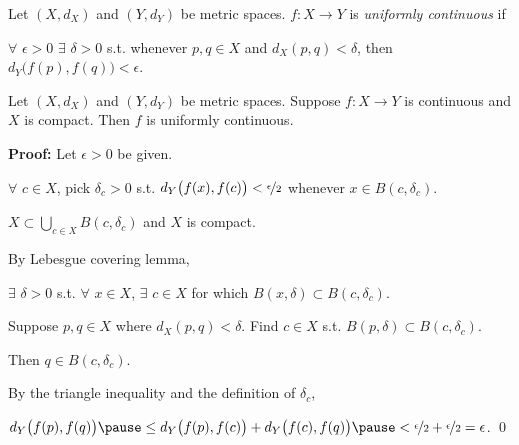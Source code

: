 \documentclass[10pt,aspectratio=169]{beamer}
\begin{document}
\begin{frame}

\begin{definition}
Let $(X,d_X)$ and $(Y,d_Y)$ be metric spaces.
$f \colon X \to Y$ is
\emph{uniformly continuous} if

\pause
$\forall$ $\epsilon > 0$
$\exists$ $\delta > 0$ s.t. whenever $p,q \in X$ and
$d_X(p,q) < \delta$, then
$d_Y\bigl(f(p),f(q)\bigr) < \epsilon$.
\end{definition}

\pause
\begin{theorem}
Let $(X,d_X)$ and $(Y,d_Y)$ be metric spaces.
Suppose $f \colon X \to Y$ is continuous and $X$ is compact.
\pause
Then $f$ is uniformly continuous.
\end{theorem}

\pause
\textbf{Proof:}
Let $\epsilon > 0$ be given.

\pause
$\forall$ $c \in X$,
pick $\delta_c > 0$ s.t.
$d_Y\bigl(f(x),f(c)\bigr) < \nicefrac{\epsilon}{2}$
whenever
$x \in B(c,\delta_c)$.

\pause
$X \subset \bigcup_{c \in X} B(c,\delta_c)$ and $X$ is compact.  

\pause
By Lebesgue covering lemma,

$\exists$ $\delta > 0$
s.t. $\forall$ $x \in X$,
$\exists$ $c \in X$
for which $B(x,\delta) \subset B(c,\delta_c)$.

\pause
\medskip

Suppose $p, q \in X$ where $d_X(p,q) < \delta$.
Find $c \in X$ s.t. $B(p,\delta) \subset B(c,\delta_c)$.

\pause
Then $q \in B(c,\delta_c)$.

\pause
By the triangle inequality
and the definition of $\delta_c$,

\medskip

$
d_Y\bigl(f(p),f(q)\bigr)
\pause
\leq
d_Y\bigl(f(p),f(c)\bigr)
+
d_Y\bigl(f(c),f(q)\bigr)
\pause
<
\nicefrac{\epsilon}{2}+
\nicefrac{\epsilon}{2} = \epsilon$.
\qed

\end{frame}
\end{document}
